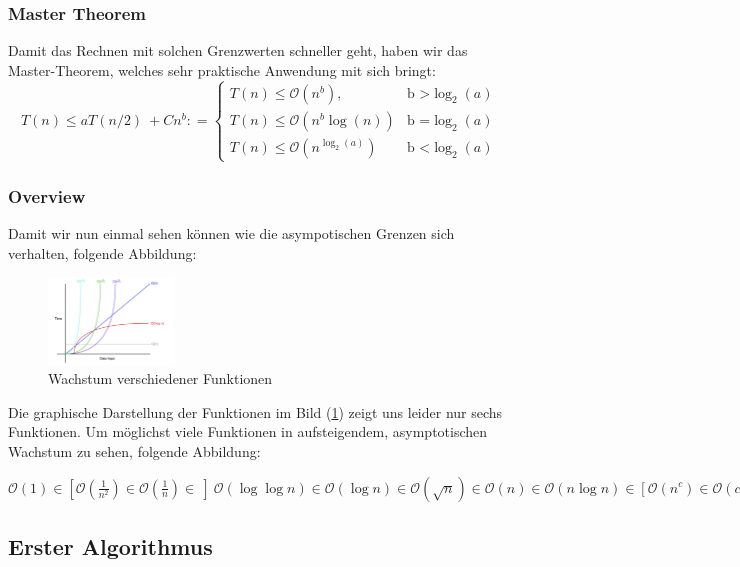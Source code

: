 \documentclass[a4paper]{article}
\begin{document}
    \subsubsection{Master Theorem}
    Damit das Rechnen mit solchen Grenzwerten schneller geht, haben wir das Master-Theorem, welches sehr praktische Anwendung mit sich bringt:
      \begin{equation} \label{MasterTheorem}
  T(n) \leq aT(n/2)\ + Cn^b: =\begin{cases}      T(n) \leq \mathcal{O}(n^b), & \text{b >} \log_2(a)\\
      T(n) \leq \mathcal{O}(n^b\log(n)) &\text{b =} \log_2(a)\\
      T(n) \leq \mathcal{O}(n^{\log_2(a)}) & \text{b <} \log_2(a)
    \end{cases}         
  \end{equation}

    \subsubsection{Overview}
    Damit wir nun einmal sehen können wie die asympotischen Grenzen sich verhalten, folgende Abbildung: 
    \begin{figure}[h]
        \centering
        \includegraphics[width=0.3\textwidth]{Pictures/big-o-notation.jpg}
        \caption{Wachstum verschiedener Funktionen}
        \label{fig: WachstumBigO}
    \end{figure}
    Die graphische Darstellung der Funktionen im Bild (\ref{fig: WachstumBigO}) zeigt uns leider nur sechs Funktionen. 
    Um möglichst viele Funktionen in aufsteigendem, asymptotischen Wachstum zu sehen, folgende Abbildung:

    $\mathcal{O}(1) \in [\mathcal{O}(\frac{1}{n^2}) \in \mathcal{O}(\frac{1}{n}) \in \ ] \  \mathcal{O}(\log \log n)\in \mathcal{O}(\log n) \in \mathcal{O}(\sqrt{n}) \in \mathcal{O}(n) \in \mathcal{O}(n\log n) \in [\mathcal{O}({n^c}) \in \mathcal{O}(c^n) \in \ ] \mathcal{O}(n^2) \in \mathcal{O}(2^n) \in \mathcal{O}(2^{n^{2}}) \in \mathcal{O}(n!) $

\newpage
\subsection{Erster Algorithmus}
\end{document}
